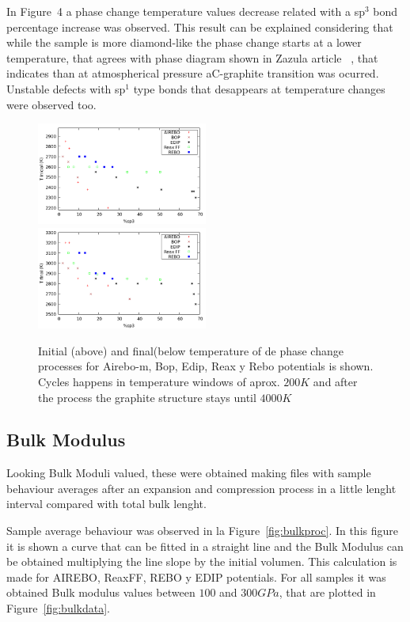 \documentclass[a4paper,fleqn]{cas-dc}
\begin{document}
In Figure~4 a phase change temperature values decrease related with a sp$^3$ bond percentage increase was observed. This result can be explained considering that while the sample is more diamond-like the phase change starts at a lower temperature, that agrees with phase diagram shown in Zazula article ~\cite{Zazula}, that indicates than at atmospherical pressure aC-graphite transition was ocurred. Unstable defects with sp$^1$ type bonds that desappears at temperature changes were observed too.
    \begin{figure}
        \includegraphics[width=0.5\textwidth]{datamelting.png}\\
        \includegraphics[width=0.5\textwidth]{datameltingfin.png}
        \caption{Initial (above) and final(below temperature of de phase change processes for Airebo-m, Bop, Edip, Reax y Rebo potentials is shown. Cycles happens in temperature windows of aprox. $200K$ and after the process the graphite structure stays until $4000K$}
        \label{fig:meltdata}
    \end{figure}
\subsection{Bulk Modulus}
Looking Bulk Moduli valued, these were obtained  making files with sample behaviour averages after an expansion and compression process in a little lenght interval compared with total bulk lenght. 

Sample average behaviour was observed in la Figure~\ref{fig:bulkproc}. In this figure it is shown a curve that can be fitted in a straight line and the Bulk Modulus can be obtained multiplying the line slope by the initial volumen. This calculation is made for AIREBO, ReaxFF, REBO y EDIP potentials. For all samples it was obtained Bulk modulus values between $100$ and $300 GPa$, that are plotted in Figure~\ref{fig:bulkdata}. 
\end{document}
